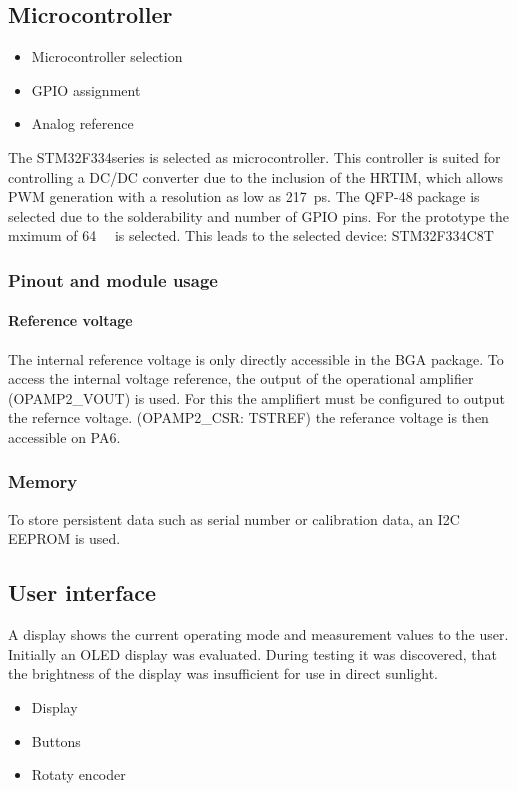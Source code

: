 \subsection{Microcontroller}
\label{sec_microcontroller}
\begin{itemize}
    \item Microcontroller selection
    \item GPIO assignment
    \item Analog reference
\end{itemize}
The STM32F334series is selected as microcontroller. This controller is suited for controlling a DC/DC converter due to the inclusion of the \ac{HRTIM}, which allows \ac{PWM} generation with a resolution as low as \qty{217}{\pico\second}. The QFP-48 package is selected due to the solderability and number of \ac{GPIO} pins. For the prototype the mximum of \qty{64}{\kibi\byte} is selected. This leads to the selected device: STM32F334C8T

\subsubsection{Pinout and module usage}
\paragraph{Reference voltage}
The internal reference voltage is only directly accessible in the BGA package. To access the internal voltage reference, the output of the operational amplifier (OPAMP2\_VOUT) is used. For this the amplifiert must be configured to output the refernce voltage. (OPAMP2\_CSR: TSTREF) the referance voltage is then accessible on PA6. 

\subsubsection{Memory}
To store persistent data such as serial number or calibration data, an \ac{I2C} \ac{EEPROM} is used. 

\FloatBarrier

\subsection{User interface}
\label{sec_ui}
A display shows the current operating mode and measurement values to the user. Initially an \ac{OLED} display was evaluated. During testing it was discovered, that the brightness of the display was insufficient for use in direct sunlight. 
\begin{itemize}
    \item Display
    \item Buttons
    \item Rotaty encoder
\end{itemize}

